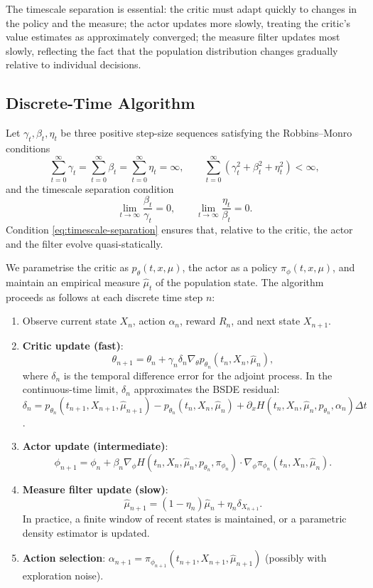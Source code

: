 The timescale separation is essential: the critic must adapt quickly to changes in
the policy and the measure; the actor updates more slowly, treating the critic's
value estimates as approximately converged; the measure filter updates most slowly,
reflecting the fact that the population distribution changes gradually relative to
individual decisions.

\subsection{Discrete-Time Algorithm}

Let $\gamma_t, \beta_t, \eta_t$ be three positive step-size sequences satisfying the
Robbins--Monro conditions
\[
    \sum_{t=0}^\infty \gamma_t = \sum_{t=0}^\infty \beta_t = \sum_{t=0}^\infty \eta_t =
    \infty, \qquad \sum_{t=0}^\infty (\gamma_t^2 + \beta_t^2 + \eta_t^2) < \infty,
\]
and the timescale separation condition
\begin{equation}
    \lim_{t \to \infty} \frac{\beta_t}{\gamma_t} = 0, \qquad \lim_{t \to \infty}
    \frac{\eta_t}{\beta_t} = 0.
    \label{eq:timescale-separation}
\end{equation}
Condition \eqref{eq:timescale-separation} ensures that, relative to the critic, the
actor and the filter evolve quasi-statically.

We parametrise the critic as $p_\theta(t,x,\mu)$, the actor as a policy
$\pi_\phi(t,x,\mu)$, and maintain an empirical measure $\hat\mu_t$ of the population
state. The algorithm proceeds as follows at each discrete time step $n$:

\begin{enumerate}
    \item Observe current state $X_n$, action $\alpha_n$, reward $R_n$, and next
    state $X_{n+1}$.
    \item \textbf{Critic update (fast)}:
    \[
        \theta_{n+1} = \theta_n + \gamma_n \delta_n \nabla_\theta p_{\theta_n}(t_n,
        X_n, \hat\mu_n),
    \]
    where $\delta_n$ is the temporal difference error for the adjoint process. In the
    continuous-time limit, $\delta_n$ approximates the BSDE residual:
    $\delta_n = p_{\theta_n}(t_{n+1}, X_{n+1}, \hat\mu_{n+1}) - p_{\theta_n}(t_n, X_n,
    \hat\mu_n) + \partial_x H(t_n, X_n, \hat\mu_n, p_{\theta_n}, \alpha_n) \Delta t$.
    \item \textbf{Actor update (intermediate)}:
    \[
        \phi_{n+1} = \phi_n + \beta_n \nabla_\phi H(t_n, X_n, \hat\mu_n, p_{\theta_n},
        \pi_{\phi_n}) \cdot \nabla_\phi \pi_{\phi_n}(t_n, X_n, \hat\mu_n).
    \]
    \item \textbf{Measure filter update (slow)}:
    \[
        \hat\mu_{n+1} = (1-\eta_n)\hat\mu_n + \eta_n \delta_{X_{n+1}}.
    \]
    In practice, a finite window of recent states is maintained, or a parametric
    density estimator is updated.
    \item \textbf{Action selection}: $\alpha_{n+1} = \pi_{\phi_{n+1}}(t_{n+1},
    X_{n+1}, \hat\mu_{n+1})$ (possibly with exploration noise).
\end{enumerate}

